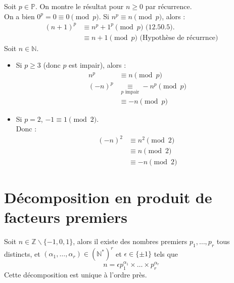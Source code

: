 \documentclass[../main.tex]{subfiles}
\begin{document}
Soit $p \in \mathbb{P}$. On montre le résultat pour $n \geq 0$ par récurrence. \\
On a bien $0^p = 0 \equiv 0 \pmod{p}$. 
Si $n^p \equiv n \pmod{p}$, alors  :
\begin{align*}
    (n + 1)^p &\equiv n^p + 1^p \pmod{p} \text{ (12.50.5)}. \\
    &\equiv n + 1 \pmod{p} \text{ (Hypothèse de récurrnce)}
\end{align*}
Soit $n \in \mathbb{N}$. \\
\begin{itemize}
    \item Si $p \geq 3$ (donc $p$ est impair), alors : 
    \begin{align*}
        n^p &\equiv n \pmod{p} \\
        (-n)^p &\underset{p \text{ impair}}{\equiv} -n^p \pmod{p} \\
        &\equiv -n \pmod{p}
    \end{align*}

    \item Si $p = 2$, $-1 \equiv 1 \pmod{2}$. \\
    Donc : 
    \begin{align*}
        (-n)^2 &\equiv n^2 \pmod{2} \\
        &\equiv n \pmod{2} \\
        &\equiv -n \pmod{2}
    \end{align*}
\end{itemize}

\section{Décomposition en produit de facteurs premiers}
\begin{tcolorbox}[title=Théorème 12.52, title filled=false, colframe=orange, colback=orange!10!white]
    Soit $n \in \mathbb{Z} \backslash \{ -1, 0, 1 \}$, alors il existe des nombres premiers $p_1, \ldots, p_r$ tous distincts, et $(\alpha_1, \ldots, \alpha_r) \in \left( \mathbb{N}^* \right)^r$ et $\epsilon \in \{ \pm 1 \}$ tels que 
    $$n = \epsilon p_1^{\alpha_1} \times \dots \times p_r^{\alpha_r}$$
    Cette décomposition est unique à l'ordre près. 
\end{tcolorbox}
\end{document}
